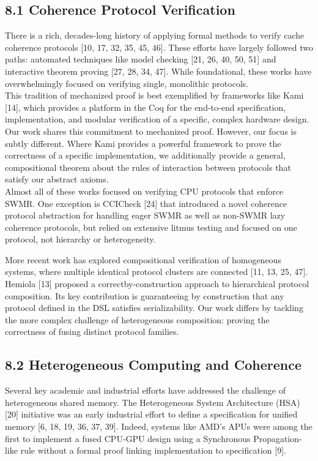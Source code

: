 \documentclass[10pt]{article}
\begin{document}
\subsection*{8.1 Coherence Protocol Verification}
There is a rich, decades-long history of applying formal methods to verify cache coherence protocols [10, 17, 32, 35, 45, 46]. These efforts have largely followed two paths: automated techniques like model checking [21, 26, 40, 50, 51] and interactive theorem proving [27, 28, 34, 47]. While foundational, these works have overwhelmingly focused on verifying single, monolithic protocols.\\[0pt]
This tradition of mechanized proof is best exemplified by frameworks like Kami [14], which provides a platform in the Coq for the end-to-end specification, implementation, and modular verification of a specific, complex hardware design. Our work shares this commitment to mechanized proof. However, our focus is subtly different. Where Kami provides a powerful framework to prove the correctness of a specific implementation, we additionally provide a general, compositional theorem about the rules of interaction between protocols that satisfy our abstract axioms.\\[0pt]
Almost all of these works focused on verifying CPU protocols that enforce SWMR. One exception is CCICheck [24] that introduced a novel coherence protocol abstraction for handling eager SWMR as well as non-SWMR lazy coherence protocols, but relied on extensive litmus testing and focused on one protocol, not hierarchy or heterogeneity.

More recent work has explored compositional verification of homogeneous systems, where multiple identical protocol clusters are connected [11, 13, 25, 47]. Hemiola [13] proposed a correctby-construction approach to hierarchical protocol composition. Its key contribution is guaranteeing by construction that any protocol defined in the DSL satisfies serializability. Our work differs by tackling the more complex challenge of heterogeneous composition: proving the correctness of fusing distinct protocol families.

\subsection*{8.2 Heterogeneous Computing and Coherence}
Several key academic and industrial efforts have addressed the challenge of heterogeneous shared memory. The Heterogeneous System Architecture (HSA) [20] initiative was an early industrial effort to define a specification for unified memory [6, 18, 19, 36, 37, 39]. Indeed, systems like AMD's APUs were among the first to implement a fused CPU-GPU design using a Synchronous Propagation-like rule without a formal proof linking implementation to specification [9].
\end{document}
